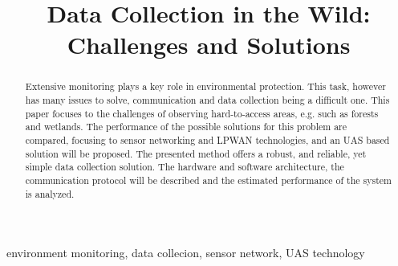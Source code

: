 \documentclass[conference]{IEEEtran}
\begin{document}
\title{Data Collection in the Wild:\\Challenges and Solutions}

\author{
\and
{}
\and
{}
}


\maketitle

\begin{abstract}

Extensive monitoring plays a key role in environmental protection. This task, however
has many issues to solve, communication and data collection being a difficult one.
This paper focuses to the challenges of observing hard-to-access areas, e.g.
such as forests and wetlands. The performance of the possible solutions for this problem
are compared, focusing to sensor networking and LPWAN technologies, and an UAS based solution
will be proposed. The presented method offers a robust, and reliable, yet simple
data collection solution. The hardware and software architecture, the communication protocol
will be described and the estimated performance of the system is analyzed.


\end{abstract}

\begin{IEEEkeywords}
environment monitoring, data collecion, sensor network, UAS technology
\end{IEEEkeywords}
\end{document}
